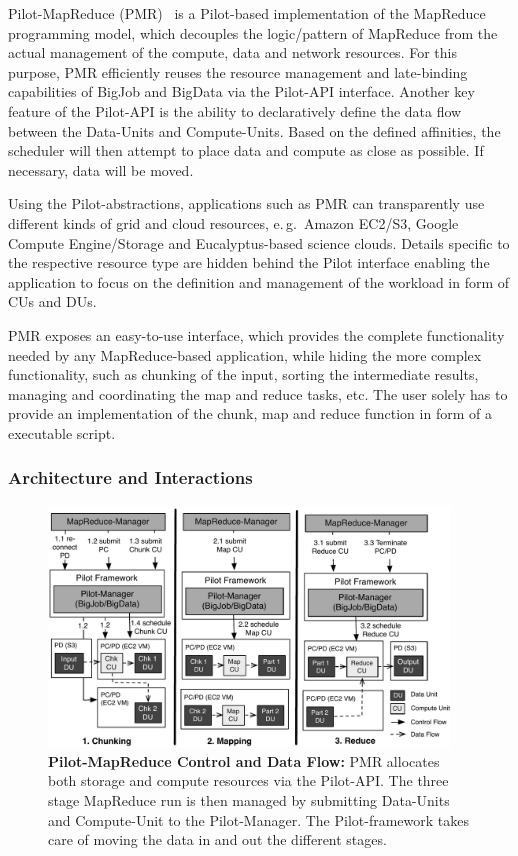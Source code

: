 \documentclass[times]{cpeauth}
\newcommand{\pilot}{Pilot\xspace}
\newcommand{\computeunit}{Compute-Unit\xspace}
\newcommand{\computeunits}{Compute-Units\xspace}
\newcommand{\dataunits}{Data-Units\xspace}
\newcommand{\dus}{DUs\xspace}
\newcommand{\cus}{CUs\xspace}
\begin{document}
Pilot-MapReduce (PMR)~\cite{Mantha:2012:PEF:2287016.2287020} is a \pilot-based
implementation of the MapReduce programming model, which decouples the
logic/pattern of MapReduce from the actual management of the compute, data and
network resources. For this purpose, PMR efficiently reuses the resource
management and late-binding capabilities of BigJob and BigData via the 
Pilot-API interface. Another key feature of the Pilot-API is the ability to 
declaratively define the data flow between the \dataunits and \computeunits. 
Based on the defined affinities, the scheduler will then attempt to place data 
and compute as close as possible. If necessary, data will be moved. 

Using the \pilot-abstractions, applications such as PMR can transparently use
different kinds of grid and cloud resources, e.\,g.\ Amazon EC2/S3, Google
Compute Engine/Storage and Eucalyptus-based science clouds. Details specific
to the respective resource type are hidden behind the \pilot interface
enabling the application to focus on the definition and management of the
workload in form of \cus and \dus.

PMR exposes an easy-to-use interface, which provides the complete
functionality needed by any MapReduce-based application, while hiding the more
complex functionality, such as chunking of the input, sorting the intermediate
results, managing and coordinating the map and reduce tasks, etc. The user
solely has to provide an implementation of the chunk, map and reduce function
in form of a executable script.

\subsubsection*{Architecture and Interactions}

\begin{figure}[t]
	\centering
    \includegraphics[width=0.95\textwidth]{figures/pmr_clouds_flow.pdf}
    \caption{\textbf{Pilot-MapReduce Control and Data Flow:} PMR allocates 
     both storage and compute resources via the \pilot-API. The three stage 
    MapReduce run is then managed by submitting \dataunits and \computeunit to 
    the \pilot-Manager. The \pilot-framework takes care of moving the data in 
    and out the different stages.}
	\label{fig:figures_pmr_clouds}
\end{figure}
\end{document}

